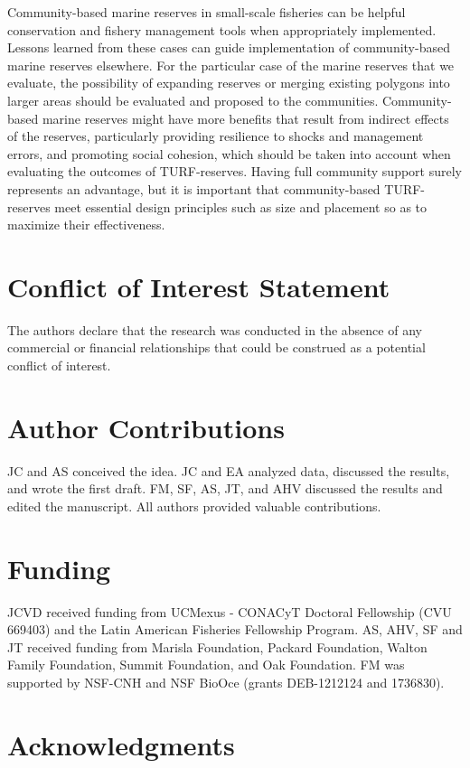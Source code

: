 \documentclass{frontiersSCNS}
\begin{document}
Community-based marine reserves in small-scale fisheries can be helpful
conservation and fishery management tools when appropriately
implemented. Lessons learned from these cases can guide implementation
of community-based marine reserves elsewhere. For the particular case of
the marine reserves that we evaluate, the possibility of expanding
reserves or merging existing polygons into larger areas should be
evaluated and proposed to the communities. Community-based marine
reserves might have more benefits that result from indirect effects of
the reserves, particularly providing resilience to shocks and management
errors, and promoting social cohesion, which should be taken into
account when evaluating the outcomes of TURF-reserves. Having full
community support surely represents an advantage, but it is important
that community-based TURF-reserves meet essential design principles such
as size and placement so as to maximize their effectiveness.

\section*{Conflict of Interest Statement}

The authors declare that the research was conducted in the absence of
any commercial or financial relationships that could be construed as a
potential conflict of interest.

\section*{Author Contributions}

JC and AS conceived the idea. JC and EA analyzed data, discussed the
results, and wrote the first draft. FM, SF, AS, JT, and AHV discussed
the results and edited the manuscript. All authors provided valuable
contributions.

\section*{Funding}

JCVD received funding from UCMexus - CONACyT Doctoral Fellowship (CVU
669403) and the Latin American Fisheries Fellowship Program. AS, AHV, SF
and JT received funding from Marisla Foundation, Packard Foundation,
Walton Family Foundation, Summit Foundation, and Oak Foundation. FM was
supported by NSF-CNH and NSF BioOce (grants DEB-1212124 and 1736830).

\section*{Acknowledgments}
\end{document}

